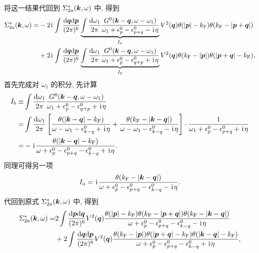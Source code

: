 将这一结果代回到 $\Sigma_{2a}^*(\boldsymbol{k},\omega)$ 中, 得到 
\begin{equation}
    \begin{aligned}
        \Sigma_{2a}^*(\boldsymbol{k},\omega)=&-2\hspace{0.1em}\mathrm{i}\hspace{0.1em}\int\frac{\mathrm{d}\boldsymbol{q}\mathrm{d}\boldsymbol{p}}{(2\pi)^6}\underbrace{\int\frac{\mathrm{d}\omega_1}{2\pi}\frac{G^0(\boldsymbol{k}-\boldsymbol{q},\omega-\omega_1)}{\omega_1+\epsilon_p^0-\epsilon_{p+q}^0-\hspace{0.1em}\mathrm{i}\hspace{0.1em}\eta}}_{I_a} V^2(\boldsymbol{q})\theta(|\boldsymbol{p}|-k_{\mathrm{F}})\theta(k_{\mathrm{F}}-|\boldsymbol{p}+\boldsymbol{q}|)\\
        &+2\hspace{0.1em}\mathrm{i}\hspace{0.1em}\int\frac{\mathrm{d}\boldsymbol{q}\mathrm{d}\boldsymbol{p}}{(2\pi)^6}\underbrace{\int\frac{\mathrm{d}\omega_1}{2\pi}\frac{G^0(\boldsymbol{k}-\boldsymbol{q},\omega-\omega_1)}{\omega_1+\epsilon_p^0-\epsilon_{q+p}^0+\hspace{0.1em}\mathrm{i}\hspace{0.1em}\eta}}_{I_b} V^2(\boldsymbol{q})\theta(k_{\mathrm{F}}-|\boldsymbol{p}|)\theta(|\boldsymbol{p}+\boldsymbol{q}|-k_{\mathrm{F}}),
    \end{aligned}
\end{equation}
首先完成对 $\omega_1$ 的积分, 先计算 
  \begin{align}
        I_b\equiv &\int\frac{\mathrm{d}\omega_1}{2\pi}\frac{G^0(\boldsymbol{k}-\boldsymbol{q},\omega-\omega_1)}{\omega_1+\epsilon_p^0-\epsilon_{q+p}^0+\hspace{0.1em}\mathrm{i}\hspace{0.1em}\eta}\nonumber\\
        =&\int\frac{\mathrm{d}\omega_1}{2\pi}\left[ \frac{\theta(|\boldsymbol{k}-\boldsymbol{q}|-k_{\mathrm{F}})}{\omega-\omega_1-\epsilon_{k-q}^0+\hspace{0.1em}\mathrm{i}\hspace{0.1em}\eta}+\frac{\theta(k_{\mathrm{F}}-|\boldsymbol{k}-\boldsymbol{q}|)}{\omega-\omega_1-\epsilon_{k-q}^0-\hspace{0.1em}\mathrm{i}\hspace{0.1em}\eta} \right]\cdot \frac{1}{\omega_1+\epsilon_p^0-\epsilon_{p+q}^0+\hspace{0.1em}\mathrm{i}\hspace{0.1em}\eta}\nonumber\\
        =&-\hspace{0.1em}\mathrm{i}\hspace{0.1em}\frac{\theta(|\boldsymbol{k}-\boldsymbol{q}|-k_{\mathrm{F}})}{\omega+\epsilon_p^0-\epsilon_{p+q}^0-\epsilon_{k-q}^0+\hspace{0.1em}\mathrm{i}\hspace{0.1em}\eta}.
    \end{align}
同理可得另一项
\begin{equation}
    I_a=\hspace{0.1em}\mathrm{i}\hspace{0.1em}\frac{\theta(k_{\mathrm{F}}-|\boldsymbol{k}-\boldsymbol{q}|)}{\omega+\epsilon_p^0-\epsilon_{p+q}^0-\epsilon_{k-q}^0-\hspace{0.1em}\mathrm{i}\hspace{0.1em}\eta}.
\end{equation}
代回到原式 $\Sigma_{2a}^*(\boldsymbol{k},\omega)$ 中, 得到 
 \begin{align}
        \Sigma_{2a}^*(\boldsymbol{k},\omega)=&2\int\frac{\mathrm{d}\boldsymbol{p}\mathrm{d}\boldsymbol{q}}{(2\pi)^6}V^2(\boldsymbol{q})\frac{\theta(|\boldsymbol{p}|-k_{\mathrm{F}})\theta(k_{\mathrm{F}}-|\boldsymbol{p}+\boldsymbol{q}|)\theta(k_{\mathrm{F}}-|\boldsymbol{k}-\boldsymbol{q}|)}{\omega+\epsilon_p^0-\epsilon_{p+q}^0-\epsilon_{k-q}^0-\hspace{0.1em}\mathrm{i}\hspace{0.1em}\eta}\nonumber\\
        &+2\int\frac{\mathrm{d}\boldsymbol{q}\mathrm{d}\boldsymbol{p}}{(2\pi)^6}V^2(\boldsymbol{q})\frac{\theta(k_{\mathrm{F}}-|\boldsymbol{p}|)\theta(|\boldsymbol{p}+\boldsymbol{q}|-k_{\mathrm{F}})\theta(|\boldsymbol{k}-\boldsymbol{q}|-k_{\mathrm{F}})}{\omega+\epsilon_p^0-\epsilon_{p+q}^0-\epsilon_{k-q}^0+\hspace{0.1em}\mathrm{i}\hspace{0.1em}\eta},
    \end{align}

